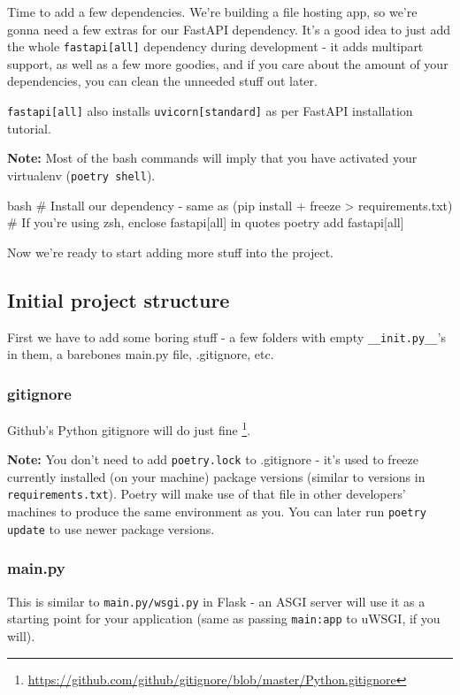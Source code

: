 \documentclass[14pt]{extarticle}
\newcommand{\flink}[1]{\footnote{\href{#1}{#1}}}
\newcommand{\note}{\textbf{\color{red}Note: }}
\newcommand{\cinline}[2]{{\lstinline[language=#1, style=cstyle, basicstyle=\ttfamily\normalsize]{#2}}}
\begin{document}
Time to add a few dependencies. We're building a file hosting app, so we're gonna need a few extras for our FastAPI dependency. It's a good idea to just add the whole \texttt{fastapi[all]} dependency during development - it adds multipart support, as well as a few more goodies, and if you care about the amount of your dependencies, you can clean the unneeded stuff out later.

\texttt{fastapi[all]} also installs \texttt{uvicorn[standard]} as per FastAPI installation tutorial.

\note Most of the bash commands will imply that you have activated your virtualenv (\cinline{bash}{poetry shell}).

\begin{code}{bash}
    # Install our dependency - same as (pip install + freeze > requirements.txt)
    # If you're using zsh, enclose fastapi[all] in quotes
    poetry add fastapi[all]
\end{code}

Now we're ready to start adding more stuff into the project.

\subsection{Initial project structure}

First we have to add some boring stuff - a few folders with empty \texttt{\_\_init.py\_\_}'s in them, a barebones main.py file, .gitignore, etc.

\subsubsection{gitignore}

Github's Python gitignore will do just fine \flink{https://github.com/github/gitignore/blob/master/Python.gitignore}.

\note You don't need to add \texttt{poetry.lock} to .gitignore - it's used to freeze currently installed (on your machine) package versions (similar to versions in \texttt{requirements.txt}). Poetry will make use of that file in other developers' machines to produce the same environment as you. You can later run \cinline{bash}{poetry update} to use newer package versions.

\subsubsection{main.py}

This is similar to \texttt{main.py/wsgi.py} in Flask - an ASGI server will use it as a starting point for your application (same as passing \texttt{main:app} to uWSGI, if you will).
\end{document}
